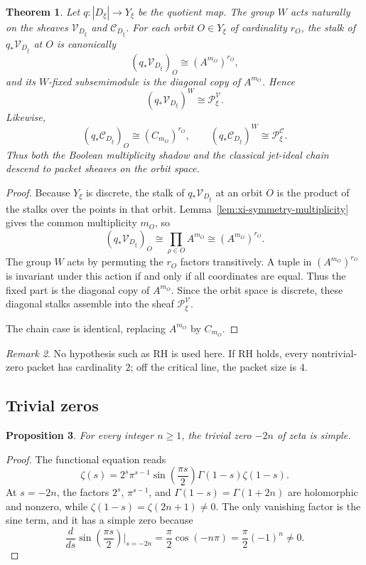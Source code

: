\documentclass[11pt,a4paper]{article}
\newtheorem{theorem}{Theorem}[section]
\newtheorem{proposition}[theorem]{Proposition}
\theoremstyle{definition}
\theoremstyle{remark}
\newtheorem{remark}[theorem]{Remark}
\newcommand{\cV}{\mathcal V}
\newcommand{\cC}{\mathcal C}
\begin{document}
\begin{theorem}\label{thm:packet-descent}
Let $q:|D_\xi|\to Y_\xi$ be the quotient map.  The group $W$ acts naturally on the sheaves $\cV_{D_\xi}$ and $\cC_{D_\xi}$.  For each orbit $O\in Y_\xi$ of cardinality $r_O$, the stalk of $q_*\cV_{D_\xi}$ at $O$ is canonically
\[
(q_*\cV_{D_\xi})_O\cong (A^{m_O})^{r_O},
\]
and its $W$-fixed subsemimodule is the diagonal copy of $A^{m_O}$.  Hence
\[
(q_*\cV_{D_\xi})^W\cong \mathcal P_\xi^{\cV}.
\]
Likewise,
\[
(q_*\cC_{D_\xi})_O\cong (C_{m_O})^{r_O},
\qquad
(q_*\cC_{D_\xi})^W\cong \mathcal P_\xi^{\cC}.
\]
Thus both the Boolean multiplicity shadow and the classical jet-ideal chain descend to packet sheaves on the orbit space.
\end{theorem}

\begin{proof}
Because $Y_\xi$ is discrete, the stalk of $q_*\cV_{D_\xi}$ at an orbit $O$ is the product of the stalks over the points in that orbit.  Lemma~\ref{lem:xi-symmetry-multiplicity} gives the common multiplicity $m_O$, so
\[
(q_*\cV_{D_\xi})_O\cong \prod_{\rho\in O}A^{m_O}\cong (A^{m_O})^{r_O}.
\]
The group $W$ acts by permuting the $r_O$ factors transitively.  A tuple in $(A^{m_O})^{r_O}$ is invariant under this action if and only if all coordinates are equal.  Thus the fixed part is the diagonal copy of $A^{m_O}$.  Since the orbit space is discrete, these diagonal stalks assemble into the sheaf $\mathcal P_\xi^{\cV}$.

The chain case is identical, replacing $A^{m_O}$ by $C_{m_O}$.
\end{proof}

\begin{remark}
No hypothesis such as RH is used here.  If RH holds, every nontrivial-zero packet has cardinality $2$; off the critical line, the packet size is $4$.
\end{remark}

\subsection{Trivial zeros}

\begin{proposition}\label{prop:trivial-simple}
For every integer $n\ge1$, the trivial zero $-2n$ of zeta is simple.
\end{proposition}

\begin{proof}
The functional equation reads
\[
\zeta(s)=2^s\pi^{s-1}\sin\!\left(\frac{\pi s}{2}\right)\Gamma(1-s)\zeta(1-s).
\]
At $s=-2n$, the factors $2^s$, $\pi^{s-1}$, and $\Gamma(1-s)=\Gamma(1+2n)$ are holomorphic and nonzero, while $\zeta(1-s)=\zeta(2n+1)\neq0$.  The only vanishing factor is the sine term, and it has a simple zero because
\[
\frac{d}{ds}\sin\!\left(\frac{\pi s}{2}\right)\Big|_{s=-2n}=\frac\pi2\cos(-n\pi)=\frac\pi2(-1)^n\neq0.
\]
\end{proof}
\end{document}
